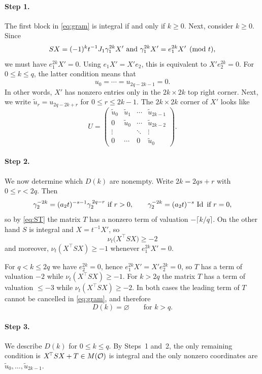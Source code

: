 \documentclass[11pt]{article}
\numberwithin{equation}{section}
\begin{document}
\begin{appendix}
\paragraph{Step 1.} 
The first block in \eqref{eq:gram} is integral if and only if $k\geqslant0$. Next, consider $k\geqslant0$. Since
\[
SX=(-1)^kt^{-1}J_1\gamma_1^{2k}X' \text{ and } \gamma_1^{2k}X'= e_1^{2k}X' \pmod{t},
\]
we must have $e_1^{2k}X'=0$. Using $e_1X'=X'e_2$, this is equivalent to $X'e_2^{2k}=0$. For $0\leqslant k\leqslant q$, the latter condition means that
\begin{equation}\label{eq:vanish}
u_0=\cdots=u_{2q-2k-1}=0.
\end{equation}
In other words, $X'$ has nonzero entries only in the $2k\times 2k$ top right corner. Next, we write $\tilde u_r=u_{2q-2k+r}$ for $ 0\leqslant r\leqslant2k-1$. The $2k\times 2k$ corner of $X'$ looks like
\begin{equation}\label{eq:U}
U=
\begin{pmatrix}
\tilde u_0&\tilde u_1&\cdots&\tilde u_{2k-1}\\
0&\tilde u_0&\cdots&\tilde u_{2k-2}\\
\vdots&&\ddots&\vdots\\
0&\cdots&0&\tilde u_0
\end{pmatrix}.
\end{equation}

\paragraph{Step 2.} We now determine which $D(k)$ are nonempty.
Write $2k=2qs+r$ with $0\leqslant r<2q$. Then
\[
\gamma_2^{-2k}=(a_2t)^{-s-1}\gamma_2^{\,2q-r} \text{ if } r>0,
\qquad
\gamma_2^{-2k}=(a_2t)^{-s}\,\operatorname{Id} \text{ if } r=0,
\]
so by \eqref{eq:ST} the matrix $T$ has a nonzero term of valuation
$-\lceil k/q\rceil$. On the other hand $S$ is integral and $X=t^{-1}X'$, so
\[
\nu_t\bigl(X^{\!\top}SX\bigr)\geqslant-2
\]
and moreover, $\nu_t(X^{\!\top}SX)\geqslant-1$ whenever $e_1^{2k}X'=0$.

For $q<k\leqslant2q$ we have $e_2^{2k}=0$, hence $e_1^{2k}X'=X'e_2^{2k}=0$, so
$T$ has a term of valuation $-2$ while $\nu_t(X^{\!\top}SX)\geqslant-1$. For
$k>2q$ the matrix $T$ has a term of valuation $\leqslant-3$ while
$\nu_t(X^{\!\top}SX)\geqslant-2$. In both cases the leading term of $T$ cannot
be cancelled in \eqref{eq:gram}, and therefore
\[
D(k)=\varnothing
\qquad\text{for }k>q.
\]

\paragraph{Step 3.}
We describe $D(k)$ for $0\leqslant k\leqslant q$. By Steps~1 and~2, the only remaining condition is $X^{\!\top}SX+T\in M(\mathcal{O})$ is integral and the only nonzero coordinates are $\tilde u_0,\dots,\tilde u_{2k-1}$.


\end{appendix}
\end{document}
